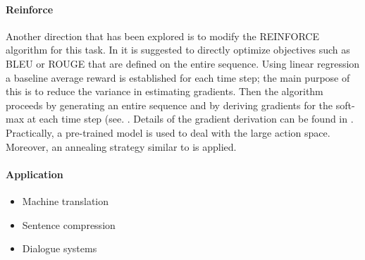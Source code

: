 \documentclass{article}
\begin{document}
\paragraph{Reinforce} Another direction that has been explored is to modify the REINFORCE algorithm \cite{williams1992simple} for this task. In \cite{ranzato2015sequence} it is suggested to directly optimize objectives  such as BLEU or ROUGE that are defined on the entire sequence. Using linear regression a baseline average reward is established for each time step; the main purpose of this is to reduce the variance in estimating gradients. Then the algorithm proceeds by generating an entire sequence and by deriving gradients for the soft-max at each time step (see. \cite[Eq.~(11)]{ranzato2015sequence}. Details of the gradient derivation can be found in \cite{zaremba2015reinforcement}. Practically, a pre-trained model is used to deal with the large action space. Moreover, an annealing strategy similar to \cite{bengio2015scheduled} is applied. 

\paragraph{Application}

\begin{itemize} \setlength{\itemsep}{3mm}
\item Machine translation \cite{bahdanau2014neural}
\item Sentence compression \cite{filippova2015sentence}
\item Dialogue systems \cite{serban2016building}
\end{itemize}




\end{document}

